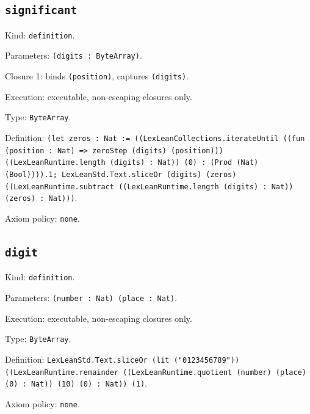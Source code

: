 \documentclass[11pt]{article}
\begin{document}
\subsection*{\texttt{significant}}
\noindent Kind: \texttt{definition}.\par
\noindent Parameters: \texttt{(digits : ByteArray)}.\par
\noindent Closure 1: binds \texttt{(position)}, captures \texttt{(digits)}.\par
\noindent Execution: executable, non-escaping closures only.\par
\noindent Type: \texttt{ByteArray}.\par
\noindent Definition: \texttt{(let zeros : Nat := ((LexLeanCollections.iterateUntil ((fun (position : Nat) => zeroStep (digits) (position))) ((LexLeanRuntime.length (digits) : Nat)) (0) : (Prod (Nat) (Bool)))).1; LexLeanStd.Text.sliceOr (digits) (zeros) ((LexLeanRuntime.subtract ((LexLeanRuntime.length (digits) : Nat)) (zeros) : Nat)))}.\par
\noindent Axiom policy: \texttt{none}.\par
\subsection*{\texttt{digit}}
\noindent Kind: \texttt{definition}.\par
\noindent Parameters: \texttt{(number : Nat) (place : Nat)}.\par
\noindent Execution: executable, non-escaping closures only.\par
\noindent Type: \texttt{ByteArray}.\par
\noindent Definition: \texttt{LexLeanStd.Text.sliceOr (lit ("0123456789")) ((LexLeanRuntime.remainder ((LexLeanRuntime.quotient (number) (place) (0) : Nat)) (10) (0) : Nat)) (1)}.\par
\noindent Axiom policy: \texttt{none}.\par
\end{document}
